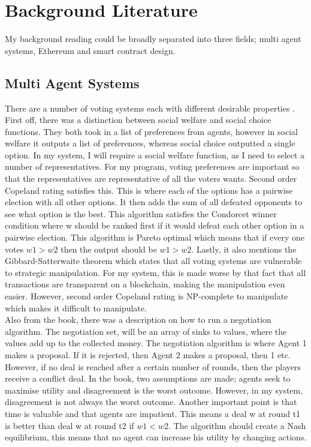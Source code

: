\chapter{Background Literature} \label{Chapter: Background  Literature}
My background reading could be broadly separated into three fields; multi agent systems, Ethereum and smart contract design.
\section{Multi Agent Systems}
There are a number of voting systems each with different desirable properties \citep{Wooldridge:2009:pdflatex}. First off, there was a distinction between social welfare and social choice functions. They both took in a list of preferences from agents, however in social welfare it outputs a list of preferences, whereas social choice outputted a single option. In my system, I will require a social welfare function, as I need to select a number of representatives. For my program, voting preferences are important so that the representatives are representative of all the voters wants. Second order Copeland rating satisfies this. This is where each of the options has a pairwise election with all other options. It then adds the sum of all defeated opponents  to see what option is the best. This algorithm satisfies the Condorcet winner condition where w should be ranked first if it would defeat each other option in a pairwise election. This algorithm is Pareto optimal which means that if every one votes $w1>w2$ then the output should be $w1>w2$. Lastly, it also mentions the Gibbard-Satterwaite theorem which states that all voting systems are vulnerable to strategic manipulation. For my system, this is made worse by that fact that all transactions are transparent on a blockchain, making the manipulation even easier. However, second order Copeland rating is NP-complete to manipulate which makes it difficult to manipulate.  \\
Also from the book, there was a description on how to run a negotiation algorithm. The negotiation set, will be an array of sinks to values, where the values add up to the collected money. The negotiation algorithm is where Agent 1 makes a proposal. If it is rejected, then Agent 2 makes a proposal, then 1 etc. However, if no deal is reached after a certain number of rounds, then the players receive a conflict deal. In the book, two assumptions are made; agents seek to maximise utility and disagreement is the worst outcome. However, in my system, disagreement is not always the worst outcome. Another important point is that time is valuable and that agents are impatient. This means a deal w at round t1 is better than deal w at round t2 if $w1<w2$. The algorithm should create a Nash equilibrium, this means that no agent can increase his utility by changing actions. \\
